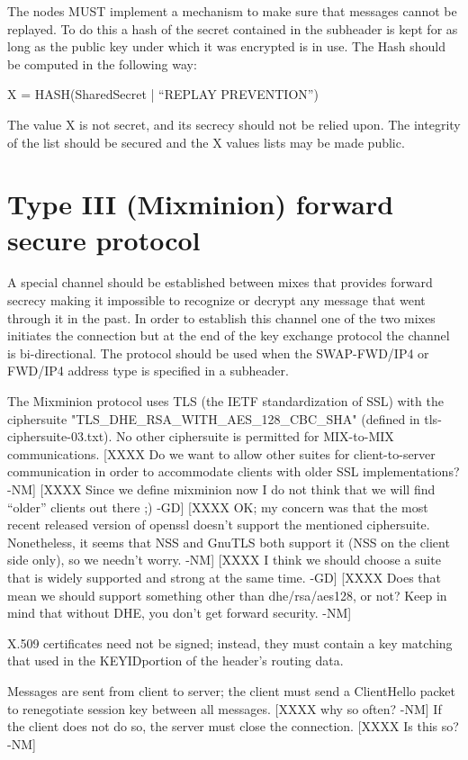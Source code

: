 The nodes MUST implement a mechanism to make sure that messages cannot
be replayed. To do this a hash of the secret contained in the
subheader is kept for as long as the public key under which it was
encrypted is in use. The Hash should be computed in the following way:

X = HASH(SharedSecret | ``REPLAY PREVENTION'')

The value X is not secret, and its secrecy should not be relied upon.
The integrity of the list should be secured and the X values lists may
be made public.

\section{Type III (Mixminion) forward secure protocol}

A special channel should be established between mixes that provides
forward secrecy making it impossible to recognize or decrypt any
message that went through it in the past. In order to establish this
channel one of the two mixes initiates the connection but at the end
of the key exchange protocol the channel is bi-directional. The
protocol should be used when the SWAP-FWD/IP4 or FWD/IP4 address type
is specified in a subheader.

The Mixminion protocol uses TLS (the IETF standardization of SSL) with
the ciphersuite "TLS_DHE_RSA_WITH_AES_128_CBC_SHA" (defined in
tls-ciphersuite-03.txt).  No other ciphersuite is permitted for
MIX-to-MIX communications.
[XXXX Do we want to allow other suites for client-to-server
      communication in order to accommodate clients with older SSL
      implementations? -NM]
[XXXX Since we define mixminion now I do not think that we will find
      ``older'' clients out there ;) -GD]
[XXXX OK; my concern was that the most recent released version of
      openssl doesn't support the mentioned ciphersuite.  Nonetheless,
      it seems that NSS and GnuTLS both support it (NSS on the client
      side only), so we needn't worry. -NM]  
[XXXX I think we should choose a suite that is widely supported and
      strong at the same time. -GD]
[XXXX Does that mean we should support something other than
      dhe/rsa/aes128, or not?  Keep in mind that without DHE, you
      don't get forward security. -NM]

X.509 certificates need not be signed; instead, they must contain
a key matching that used in the KEYIDportion of the header's routing
data.  

Messages are sent from client to server; the client must send a
ClientHello packet to renegotiate session key between all
messages. [XXXX why so often? -NM] If the client does not do so, the
server must close the connection.  [XXXX Is this so? -NM]

